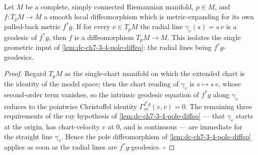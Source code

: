 \begin{lemma}
  \label{lem:dc-ch7-3-4-ray-reduction}
  \leanok
  Let $M$ be a complete, simply connected Riemannian manifold, $p\in M$, and
  $f:T_pM\to M$ a smooth local diffeomorphism which is metric-expanding for its own
  pulled-back metric $f^*g$. If for every $v\in T_pM$ the radial line
  $\gamma_v(s)=s\,v$ is a geodesic of $f^*g$, then $f$ is a diffeomorphism
  $T_pM\to M$. This isolates the single geometric input of
  \cref{lem:dc-ch7-3-4-pole-diffeo}: the radial lines being $f^*g$-geodesics.
\end{lemma}
\begin{proof}
  \leanok
  Regard $T_pM$ as the single-chart manifold on which the extended chart is the
  identity of the model space; then the chart reading of $\gamma_v$ is $s\mapsto s\,v$,
  whose second-order term vanishes, so the intrinsic geodesic equation of $f^*g$ along
  $\gamma_v$ reduces to the pointwise Christoffel identity
  $\Gamma^{f^*g}_{sv}(v,v)=0$. The remaining three requirements of the ray hypothesis
  of \cref{lem:dc-ch7-3-4-pole-diffeo} — that $\gamma_v$ starts at the origin, has
  chart-velocity $v$ at $0$, and is continuous — are immediate for the straight line
  $\gamma_v$. Hence the pole diffeomorphism of \cref{lem:dc-ch7-3-4-pole-diffeo}
  applies as soon as the radial lines are $f^*g$-geodesics. $\square$
\end{proof}

